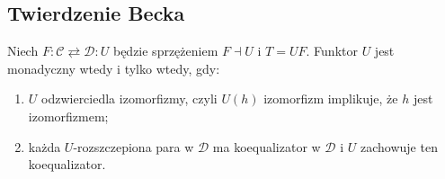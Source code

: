 \subsection{Twierdzenie Becka}

\begin{twierdzenie}\label{cat:thm:beck-monadicity}
Niech $F:\mathcal C\rightleftarrows\mathcal D:U$ będzie sprzężeniem $F\dashv U$ i $T=UF$. Funktor $U$ jest monadyczny wtedy i tylko wtedy, gdy:
\begin{enumerate}
 \item $U$ odzwierciedla izomorfizmy, czyli $U(h)$ izomorfizm implikuje, że $h$ jest izomorfizmem;
 \item każda $U$-rozszczepiona para w $\mathcal D$ ma koequalizator w $\mathcal D$ i $U$ zachowuje ten koequalizator.
\end{enumerate}
\end{twierdzenie}
